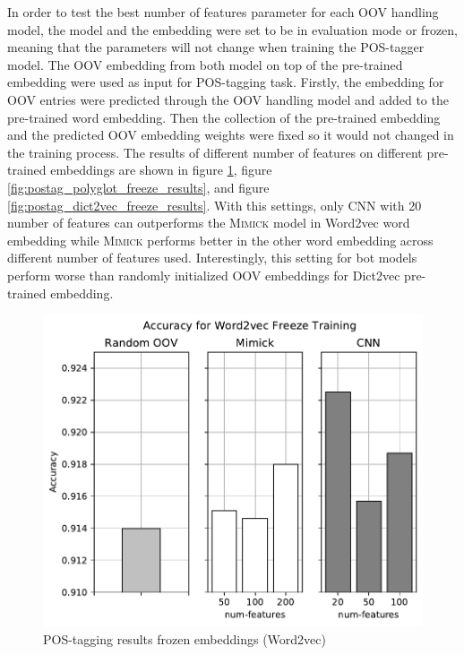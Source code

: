       In order to test the best number of features parameter for each
      OOV handling model, the model and the embedding were set to be
      in evaluation mode or frozen, meaning that the parameters will
      not change when training the POS-tagger model. The OOV embedding
      from both model on top of the pre-trained embedding were used as
      input for POS-tagging task. Firstly, the embedding for OOV
      entries were predicted through the OOV handling model and added to the
      pre-trained word embedding. Then the collection of the
      pre-trained embedding and the predicted OOV embedding weights
      were fixed so it would not changed in the training process. The
      results of different number of features on different pre-trained
      embeddings are shown in figure
      \ref{fig:postag_word2vec_freeze_results}, figure
      \ref{fig:postag_polyglot_freeze_results}, and figure
      \ref{fig:postag_dict2vec_freeze_results}. With this settings,
      only CNN with 20 number of features can outperforms the
      \textsc{Mimick} model in Word2vec word embedding while
      \textsc{Mimick} performs better in the other word embedding
      across different number of features used. Interestingly, this
      setting for bot models perform worse than randomly initialized
      OOV embeddings for Dict2vec pre-trained embedding.
      \begin{figure}[H]
        \centering
        \includegraphics[width=0.8\linewidth]{images/freeze_word2vec.pdf}
        \caption{POS-tagging results frozen embeddings (Word2vec)}
        \label{fig:postag_word2vec_freeze_results}
      \end{figure}

